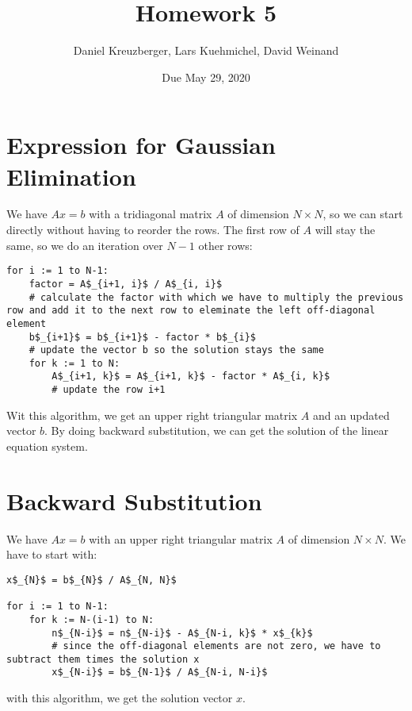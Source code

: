 \documentclass[11pt, a4paper]{article}
\title{Homework 5}
\date{Due May 29, 2020}
\author{Daniel Kreuzberger, Lars Kuehmichel, David Weinand}
\begin{document}
\maketitle
\section{Expression for Gaussian Elimination}
We have $Ax = b$ with a tridiagonal matrix $A$ of dimension $N \times N$, so we can start directly without having to reorder the rows. The first row of $A$ will stay the same, so we do an iteration over $N-1$ other rows:

\begin{lstlisting}
for i := 1 to N-1:
    factor = A$_{i+1, i}$ / A$_{i, i}$
    # calculate the factor with which we have to multiply the previous row and add it to the next row to eleminate the left off-diagonal element
    b$_{i+1}$ = b$_{i+1}$ - factor * b$_{i}$
    # update the vector b so the solution stays the same
    for k := 1 to N:
        A$_{i+1, k}$ = A$_{i+1, k}$ - factor * A$_{i, k}$
        # update the row i+1
\end{lstlisting}

Wit this algorithm, we get an upper right triangular matrix $A$ and an updated vector $b$. By doing backward substitution, we can get the solution of the linear equation system.
\newpage
\section{Backward Substitution}
We have $Ax = b$ with an upper right triangular matrix $A$ of dimension $N \times N$. We have to start with:
\begin{lstlisting}
x$_{N}$ = b$_{N}$ / A$_{N, N}$

for i := 1 to N-1:
    for k := N-(i-1) to N:
        n$_{N-i}$ = n$_{N-i}$ - A$_{N-i, k}$ * x$_{k}$
        # since the off-diagonal elements are not zero, we have to subtract them times the solution x
        x$_{N-i}$ = b$_{N-1}$ / A$_{N-i, N-i}$
\end{lstlisting}

with this algorithm, we get the solution vector $x$.
\end{document}
